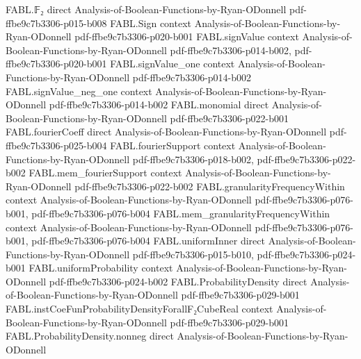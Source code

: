 \begin{theorem}
\label{FABL.densityExpectation_eq_uniformInner}
\leanok
{}
\proofstep
  {FABL.𝔽₂}
  {direct}
  {Analysis-of-Boolean-Functions-by-Ryan-ODonnell}
  {pdf-ffbe9c7b3306-p015-b008}
\proofstep
  {FABL.Sign}
  {context}
  {Analysis-of-Boolean-Functions-by-Ryan-ODonnell}
  {pdf-ffbe9c7b3306-p020-b001}
\proofstep
  {FABL.signValue}
  {context}
  {Analysis-of-Boolean-Functions-by-Ryan-ODonnell}
  {pdf-ffbe9c7b3306-p014-b002,
    pdf-ffbe9c7b3306-p020-b001}
\proofstep
  {FABL.signValue_one}
  {context}
  {Analysis-of-Boolean-Functions-by-Ryan-ODonnell}
  {pdf-ffbe9c7b3306-p014-b002}
\proofstep
  {FABL.signValue_neg_one}
  {context}
  {Analysis-of-Boolean-Functions-by-Ryan-ODonnell}
  {pdf-ffbe9c7b3306-p014-b002}
\proofstep
  {FABL.monomial}
  {direct}
  {Analysis-of-Boolean-Functions-by-Ryan-ODonnell}
  {pdf-ffbe9c7b3306-p022-b001}
\proofstep
  {FABL.fourierCoeff}
  {direct}
  {Analysis-of-Boolean-Functions-by-Ryan-ODonnell}
  {pdf-ffbe9c7b3306-p025-b004}
\proofstep
  {FABL.fourierSupport}
  {context}
  {Analysis-of-Boolean-Functions-by-Ryan-ODonnell}
  {pdf-ffbe9c7b3306-p018-b002,
    pdf-ffbe9c7b3306-p022-b002}
\proofstep
  {FABL.mem_fourierSupport}
  {context}
  {Analysis-of-Boolean-Functions-by-Ryan-ODonnell}
  {pdf-ffbe9c7b3306-p022-b002}
\proofstep
  {FABL.granularityFrequencyWithin}
  {context}
  {Analysis-of-Boolean-Functions-by-Ryan-ODonnell}
  {pdf-ffbe9c7b3306-p076-b001,
    pdf-ffbe9c7b3306-p076-b004}
\proofstep
  {FABL.mem_granularityFrequencyWithin}
  {context}
  {Analysis-of-Boolean-Functions-by-Ryan-ODonnell}
  {pdf-ffbe9c7b3306-p076-b001,
    pdf-ffbe9c7b3306-p076-b004}
\proofstep
  {FABL.uniformInner}
  {direct}
  {Analysis-of-Boolean-Functions-by-Ryan-ODonnell}
  {pdf-ffbe9c7b3306-p015-b010,
    pdf-ffbe9c7b3306-p024-b001}
\proofstep
  {FABL.uniformProbability}
  {context}
  {Analysis-of-Boolean-Functions-by-Ryan-ODonnell}
  {pdf-ffbe9c7b3306-p024-b002}
\proofstep
  {FABL.ProbabilityDensity}
  {direct}
  {Analysis-of-Boolean-Functions-by-Ryan-ODonnell}
  {pdf-ffbe9c7b3306-p029-b001}
\proofstep
  {FABL.instCoeFunProbabilityDensityForallF₂CubeReal}
  {context}
  {Analysis-of-Boolean-Functions-by-Ryan-ODonnell}
  {pdf-ffbe9c7b3306-p029-b001}
\proofstep
  {FABL.ProbabilityDensity.nonneg}
  {direct}
  {Analysis-of-Boolean-Functions-by-Ryan-ODonnell}

\end{theorem}
